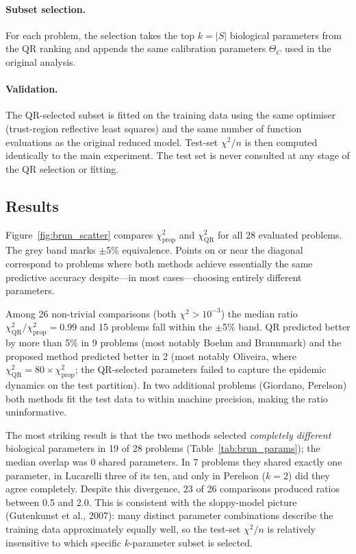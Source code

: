 \paragraph{Subset selection.}
For each problem, the selection takes the top $k = |S|$ biological parameters from the QR ranking and appends the same calibration parameters $\Theta_C$ used in the original analysis.

\paragraph{Validation.}
The QR-selected subset is fitted on the training data using the same optimiser (trust-region reflective least squares) and the same number of function evaluations as the original reduced model.  Test-set $\chi^2/n$ is then computed identically to the main experiment.  The test set is never consulted at any stage of the QR selection or fitting.

\subsection*{Results}

Figure~\ref{fig:brun_scatter} compares $\chi^2_{\mathrm{prop}}$ and $\chi^2_{\mathrm{QR}}$ for all 28 evaluated problems.  The grey band marks $\pm$5\% equivalence.  Points on or near the diagonal correspond to problems where both methods achieve essentially the same predictive accuracy despite---in most cases---choosing entirely different parameters.

Among 26 non-trivial comparisons (both $\chi^2 > 10^{-3}$) the median ratio $\chi^2_{\mathrm{QR}}/\chi^2_{\mathrm{prop}} = 0.99$ and 15 problems fall within the $\pm$5\% band.  QR predicted better by more than 5\% in 9 problems (most notably Boehm and Brannmark) and the proposed method predicted better in 2 (most notably Oliveira, where $\chi^2_{\mathrm{QR}} = 80\times\chi^2_{\mathrm{prop}}$; the QR-selected parameters failed to capture the epidemic dynamics on the test partition).  In two additional problems (Giordano, Perelson) both methods fit the test data to within machine precision, making the ratio uninformative.

The most striking result is that the two methods selected \emph{completely different} biological parameters in 19 of 28 problems (Table~\ref{tab:brun_params}); the median overlap was 0 shared parameters.  In 7 problems they shared exactly one parameter, in Lucarelli three of its ten, and only in Perelson ($k=2$) did they agree completely.  Despite this divergence, 23 of 26 comparisons produced ratios between 0.5 and 2.0.  This is consistent with the sloppy-model picture (Gutenkunst et al., 2007): many distinct parameter combinations describe the training data approximately equally well, so the test-set $\chi^2/n$ is relatively insensitive to which specific $k$-parameter subset is selected.

